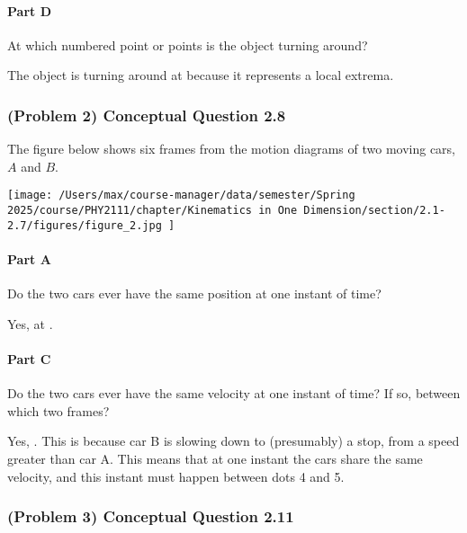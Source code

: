 \paragraph{Part D}
At which numbered point or points is the object turning around?

\begin{solution}
	The object is turning around at  because it represents a local extrema.
\end{solution}

\newpage

\subsubsection{(Problem 2) Conceptual Question 2.8}

The figure below shows six frames from the motion diagrams of two moving cars, $A$ and $B$.

\begin{center}
	\texttt{[image: /Users/max/course-manager/data/semester/Spring 2025/course/PHY2111/chapter/Kinematics in One Dimension/section/2.1-2.7/figures/figure\_2.jpg
	]}
\end{center}

\paragraph{Part A}
Do the two cars ever have the same position at one instant of time?

\begin{solution}
	Yes, at .
\end{solution}

\paragraph{Part C}
Do the two cars ever have the same velocity at one instant of time? If so, between which two frames?

\begin{solution}
	Yes, . This is because car B is slowing down to (presumably) a stop, from a speed greater than car A. This means that at one instant the cars share the same velocity, and this instant must happen between dots 4 and 5.
\end{solution}

\newpage

\subsubsection{(Problem 3) Conceptual Question 2.11}

